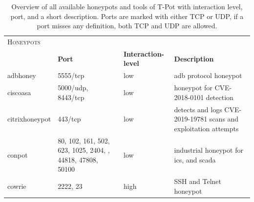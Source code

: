 \begin{table}
    \centering
    \caption[Overview honeypots of T-Pot]{Overview of all available honeypots and tools of T-Pot with interaction level, port, and a short description. Ports are marked with either TCP or UDP, if a port misses any definition, both TCP and UDP are allowed.}
    \begin{tabularx}{\linewidth}{l|XlX}
        \toprule
        \textsc{Honeypots}                       & \multicolumn{3}{c}{}                                                                                                                                                                                                            \\
                                                 & \textbf{Port}                                                                                               & \textbf{Interaction-level} & \textbf{Description}                                                                 \\
        \hline
        adbhoney \cite{adbhoney2021}             & 5555/tcp                                                                                                    & low                        & \ac{adb} protocol honeypot                                                           \\
        ciscoasa \cite{cymmetria2018}            & 5000/udp, 8443/tcp                                                                                          & low                        & honeypot for CVE-2018-0101\cite{CVE-2018-0101} detection                             \\
        citrixhoneypot \cite{citrixhoneypot2020} & 443/tcp                                                                                                     & low                        & detects and logs CVE-2019-19781\cite{CVE-2019-19781} scans and exploitation attempts \\
        conpot \cite{conpot2021}                 & 80, 102, 161, 502, 623, 1025, 2404, \newline 10001, 44818, 47808, 50100                                     & low                        & industrial honeypot for \ac{ics}, and \ac{scada}                                     \\
        cowrie \cite{cowire2021}                 & 2222, 23                                                                                                    & high                       & SSH and Telnet honeypot                                                              \\

\end{tabularx}
\end{table}
